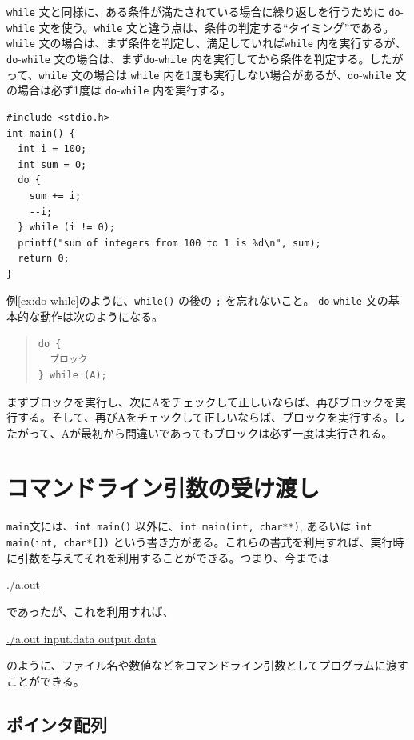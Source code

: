 \verb|while| 文と同様に、ある条件が満たされている場合に繰り返しを行うために \verb|do|-\verb|while| 文を使う。\verb|while| 文と違う点は、条件の判定する``タイミング''である。\verb|while| 文の場合は、まず条件を判定し、満足していれば\verb|while| 内を実行するが、\verb|do|-\verb|while| 文の場合は、まず\verb|do|-\verb|while| 内を実行してから条件を判定する。したがって、\verb|while| 文の場合は \verb|while| 内を1度も実行しない場合があるが、\verb|do|-\verb|while| 文の場合は必ず1度は \verb|do|-\verb|while| 内を実行する。
\begin{reidai}\label{ex:do-while}
\begin{verbatim}
#include <stdio.h>
int main() {
  int i = 100;
  int sum = 0;
  do {
    sum += i;
    --i;
  } while (i != 0);
  printf("sum of integers from 100 to 1 is %d\n", sum);
  return 0;
}
\end{verbatim}
\end{reidai} \noindent
例\ref{ex:do-while}のように、\verb|while()| の後の \verb|;| を忘れないこと。
\verb|do|-\verb|while| 文の基本的な動作は次のようになる。
\begin{quote}
\begin{verbatim}
do {
  ブロック
} while (A);
\end{verbatim}
\end{quote}
まずブロックを実行し、次にAをチェックして正しいならば、再びブロックを実行する。そして、再びAをチェックして正しいならば、ブロックを実行する。したがって、Aが最初から間違いであってもブロックは必ず一度は実行される。

\section{コマンドライン引数の受け渡し}
{\tt main}文には、\verb|int main()| 以外に、\verb|int main(int, char**)|, あるいは \verb|int main(int, char*[])| という書き方がある。これらの書式を利用すれば、実行時に引数を与えてそれを利用することができる。つまり、今までは
\begin{commandline2}
\prompt \underline{./a.out}
\end{commandline2} \noindent
であったが、これを利用すれば、
\begin{commandline2}
\prompt \underline{./a.out input.data output.data}
\end{commandline2} \noindent
のように、ファイル名や数値などをコマンドライン引数としてプログラムに渡すことができる。

\subsection{ポインタ配列}

